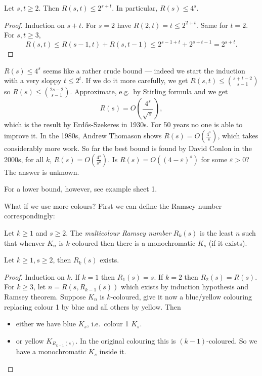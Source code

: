 \documentclass[a4paper]{article}
\begin{document}
\begin{corollary}
  Let \(s, t \geq 2\). Then \(R(s, t) \leq 2^{s + t}\). In particular, \(R(s) \leq 4^s\).
\end{corollary}

\begin{proof}
  Induction on \(s + t\). For \(s = 2\) have \(R(2, t) = t \leq 2^{2 + t}\). Same for \(t = 2\). For \(s, t \geq 3\),
  \[
    R(s, t) \leq R(s - 1, t) + R(s, t - 1) \leq 2^{s - 1 + t} + 2^{s + t - 1} = 2^{s + t}.
  \]
\end{proof}

\(R(s) \leq 4^s\) seems like a rather crude bound --- indeed we start the induction with a very sloppy \(t \leq 2^t\). If we do it more carefully, we get \(R(s, t) \leq \binom{s + t - 2}{s - 1}\) so \(R(s) \leq \binom{2s - 2}{s - 1}\). Approximate, e.g.\ by Stirling formula and we get
\[
  R(s) = O(\frac{4^s}{\sqrt s}),
\]
which is the result by Erdős-Szekeres in 1930s. For 50 years no one is able to improve it. In the 1980s, Andrew Thomason shows \(R(s) = O(\frac{4^s}{s})\), which takes considerably more work. So far the best bound is found by David Conlon in the 2000s, for all \(k\), \(R(s) = O(\frac{4^s}{s^k})\). Is \(R(s) = O((4 - \varepsilon)^s)\) for some \(\varepsilon > 0\)? The answer is unknown.

For a lower bound, however, see example sheet 1.

What if we use more colours? First we can define the Ramsey number correspondingly:

\begin{definition}
  Let \(k \geq 1\) and \(s \geq 2\). The \emph{multicolour Ramsey number} \(R_k(s)\) is the least \(n\) such that whenver \(K_n\) is \(k\)-coloured then there is a monochromatic \(K_s\) (if it exists).
\end{definition}

\begin{theorem}
  Let \(k \geq 1, s \geq 2\), then \(R_k(s)\) exists.
\end{theorem}

\begin{proof}
  Induction on \(k\). If \(k = 1\) then \(R_1(s) = s\). If \(k = 2\) then \(R_2(s) = R(s)\). For \(k \geq 3\), let \(n = R(s, R_{k - 1}(s))\) which exists by induction hypothesis and Ramsey theorem. Suppose \(K_n\) is \(k\)-coloured, give it now a blue/yellow colouring replacing colour 1 by blue and all others by yellow. Then
  \begin{itemize}
  \item either we have blue \(K_s\), i.e.\ colour 1 \(K_s\).
  \item or yellow \(K_{R_{k - 1}(s)}\). In the original colouring this is \((k - 1)\)-coloured. So we have a monochromatic \(K_s\) inside it.
  \end{itemize}
\end{proof}
\end{document}
